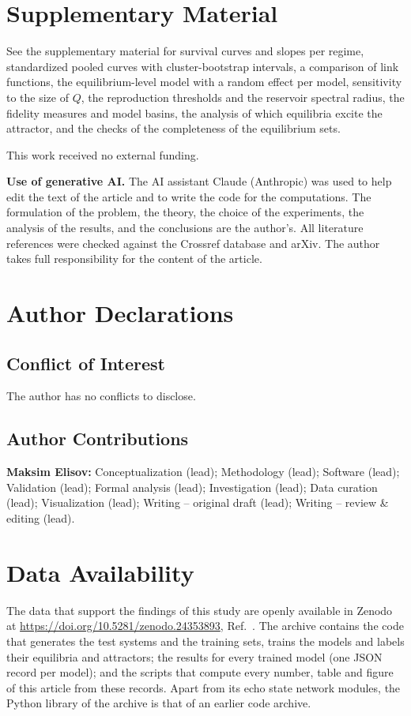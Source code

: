\section*{Supplementary Material}
See the supplementary material for survival curves and slopes per regime, standardized pooled curves with cluster-bootstrap
intervals, a comparison of link functions, the equilibrium-level model with a random effect per model, sensitivity to the
size of $Q$, the reproduction thresholds and the reservoir spectral radius, the fidelity measures and model basins,
the analysis of which equilibria excite the attractor, and the checks of the completeness of the equilibrium sets.

\begin{acknowledgments}
This work received no external funding.

\textbf{Use of generative AI.} The AI assistant Claude (Anthropic) was used to help edit the text of the article and to write the code for the computations. The formulation of the problem, the theory, the choice of the experiments, the analysis of the results, and the conclusions are the author's. All literature references were checked against the Crossref database and arXiv. The author takes full responsibility for the content of the article.
\end{acknowledgments}

\section*{Author Declarations}

\subsection*{Conflict of Interest}
The author has no conflicts to disclose.

\subsection*{Author Contributions}
\textbf{Maksim Elisov:} Conceptualization (lead); Methodology (lead); Software (lead); Validation (lead); Formal analysis (lead); Investigation (lead); Data curation (lead); Visualization (lead); Writing -- original draft (lead); Writing -- review \& editing (lead).

\section*{Data Availability}
The data that support the findings of this study are openly available in Zenodo at
\url{https://doi.org/10.5281/zenodo.24353893}, Ref.~. The archive contains the code that
generates the test systems and the training sets, trains the models and labels their equilibria and attractors; the results
for every trained model (one JSON record per model); and the scripts that compute every number, table and figure of this
article from these records. Apart from its echo state network modules, the Python library of the archive is that of an
earlier code archive.\cite{Elisov2026Code}
